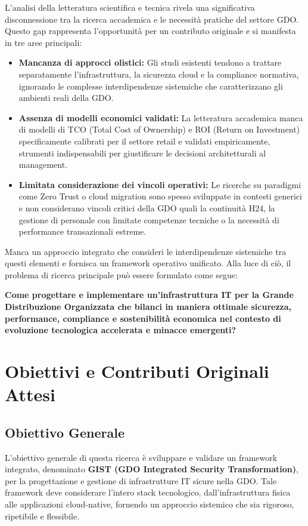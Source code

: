 L'analisi della letteratura scientifica e tecnica rivela una significativa disconnessione tra la ricerca accademica e le necessità pratiche del settore GDO. Questo gap rappresenta l'opportunità per un contributo originale e si manifesta in tre aree principali:
\begin{itemize}
    \item \textbf{Mancanza di approcci olistici:} Gli studi esistenti tendono a trattare separatamente l'infrastruttura, la sicurezza cloud e la compliance normativa, ignorando le complesse interdipendenze sistemiche che caratterizzano gli ambienti reali della GDO.
    \item \textbf{Assenza di modelli economici validati:} La letteratura accademica manca di modelli di TCO (Total Cost of Ownership) e ROI (Return on Investment) specificamente calibrati per il settore retail e validati empiricamente, strumenti indispensabili per giustificare le decisioni architetturali al management.
    \item \textbf{Limitata considerazione dei vincoli operativi:} Le ricerche su paradigmi come Zero Trust o cloud migration sono spesso sviluppate in contesti generici e non considerano vincoli critici della GDO quali la continuità H24, la gestione di personale con limitate competenze tecniche o la necessità di performance transazionali estreme.
\end{itemize}
Manca un approccio integrato che consideri le interdipendenze sistemiche tra questi elementi e fornisca un framework operativo unificato. Alla luce di ciò, il problema di ricerca principale può essere formulato come segue:

\textbf{Come progettare e implementare un'infrastruttura IT per la Grande Distribuzione Organizzata che bilanci in maniera ottimale sicurezza, performance, compliance e sostenibilità economica nel contesto di evoluzione tecnologica accelerata e minacce emergenti?}

\section{Obiettivi e Contributi Originali Attesi}
\subsection{Obiettivo Generale}
L'obiettivo generale di questa ricerca è sviluppare e validare un framework integrato, denominato \textbf{GIST (GDO Integrated Security Transformation)}, per la progettazione e gestione di infrastrutture IT sicure nella GDO. Tale framework deve considerare l'intero stack tecnologico, dall'infrastruttura fisica alle applicazioni cloud-native, fornendo un approccio sistemico che sia rigoroso, ripetibile e flessibile.

